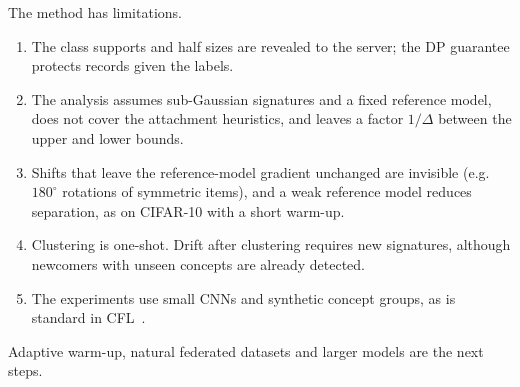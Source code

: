 \documentclass[journal]{IEEEtran}
\theoremstyle{definition}
\begin{document}
The method has limitations.
\begin{enumerate}
\item The class supports and half sizes are revealed to the server; the DP guarantee protects records given the labels.
\item The analysis assumes sub-Gaussian signatures and a fixed reference model, does not cover the attachment heuristics, and leaves a factor $1/\Delta$ between the upper and lower bounds.
\item Shifts that leave the reference-model gradient unchanged are invisible (e.g.\ $180^\circ$ rotations of symmetric items), and a weak reference model reduces separation, as on CIFAR-10 with a short warm-up.
\item Clustering is one-shot. Drift after clustering requires new signatures, although newcomers with unseen concepts are already detected.
\item The experiments use small CNNs and synthetic concept groups, as is standard in CFL~\cite{benali2026survey}.
\end{enumerate}
Adaptive warm-up, natural federated datasets and larger models are the next steps.
\end{document}
